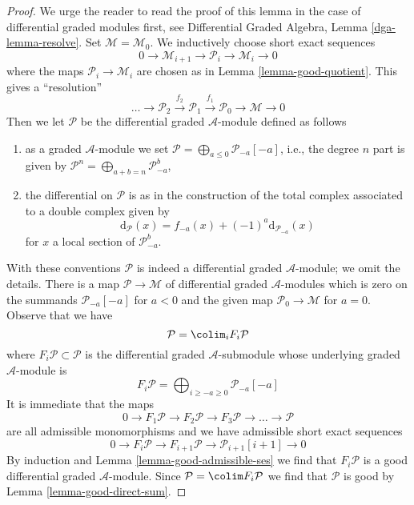 \begin{proof}
We urge the reader to read the proof of this lemma in the case of
differential graded modules first, see Differential Graded Algebra,
Lemma \ref{dga-lemma-resolve}. Set $\mathcal{M} = \mathcal{M}_0$.
We inductively choose short exact sequences
$$
0 \to \mathcal{M}_{i + 1} \to \mathcal{P}_i \to \mathcal{M}_i \to 0
$$
where the maps
$\mathcal{P}_i \to \mathcal{M}_i$ are chosen as in
Lemma \ref{lemma-good-quotient}.
This gives a ``resolution''
$$
\ldots \to \mathcal{P}_2 \xrightarrow{f_2}
\mathcal{P}_1 \xrightarrow{f_1} \mathcal{P}_0 \to \mathcal{M} \to 0
$$
Then we let $\mathcal{P}$ be the differential graded
$\mathcal{A}$-module defined as follows
\begin{enumerate}
\item as a graded $\mathcal{A}$-module we set
$\mathcal{P} = \bigoplus_{a \leq 0} \mathcal{P}_{-a}[-a]$, i.e.,
the degree $n$ part is given by
$\mathcal{P}^n = \bigoplus\nolimits_{a + b = n} \mathcal{P}_{-a}^b$,
\item the differential on $\mathcal{P}$ is as in the construction of
the total complex associated to a double complex given by
$$
\text{d}_\mathcal{P}(x) = f_{-a}(x) + (-1)^a \text{d}_{\mathcal{P}_{-a}}(x)
$$
for $x$ a local section of $\mathcal{P}_{-a}^b$.
\end{enumerate}
With these conventions $\mathcal{P}$ is indeed a
differential graded $\mathcal{A}$-module; we omit the details.
There is a map $\mathcal{P} \to \mathcal{M}$ of differential graded
$\mathcal{A}$-modules which is zero on the summands $\mathcal{P}_{-a}[-a]$
for $a < 0$ and the given map $\mathcal{P}_0 \to \mathcal{M}$ for $a = 0$.
Observe that we have
$$
\mathcal{P} = \colim_i F_i\mathcal{P}
$$
where $F_i\mathcal{P} \subset \mathcal{P}$ is the differential
graded $\mathcal{A}$-submodule whose underlying graded $\mathcal{A}$-module
is
$$
F_i\mathcal{P} =
\bigoplus\nolimits_{i \geq -a \geq 0} \mathcal{P}_{-a}[-a]
$$
It is immediate that the maps
$$
0 \to F_1\mathcal{P} \to F_2\mathcal{P} \to F_3\mathcal{P} \to
\ldots \to \mathcal{P}
$$
are all admissible monomorphisms and we have admissible short exact sequences
$$
0 \to F_i\mathcal{P} \to
F_{i + 1}\mathcal{P} \to
\mathcal{P}_{i + 1}[i + 1] \to 0
$$
By induction and Lemma \ref{lemma-good-admissible-ses}
we find that $F_i\mathcal{P}$ is a good differential graded
$\mathcal{A}$-module. Since $\mathcal{P} = \colim F_i\mathcal{P}$
we find that $\mathcal{P}$ is good by Lemma \ref{lemma-good-direct-sum}.


\end{proof}
